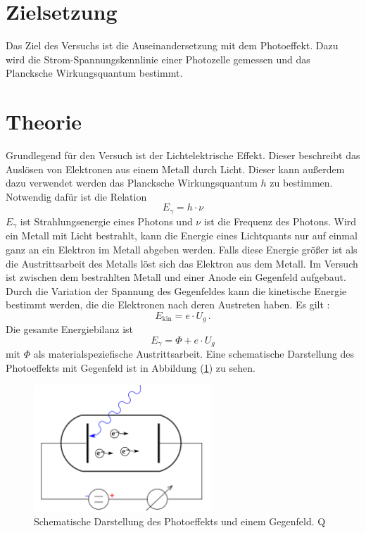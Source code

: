 \section{Zielsetzung}
\label{sec:Zielsetzung}
Das Ziel des Versuchs ist die Auseinandersetzung mit dem Photoeffekt. 
Dazu wird die Strom-Spannungskennlinie einer Photozelle gemessen und 
das Plancksche Wirkungsquantum bestimmt. 
\section{Theorie}
\label{sec:Theorie}
Grundlegend für den Versuch ist der Lichtelektrische Effekt. Dieser 
beschreibt das Auslösen von Elektronen aus einem Metall durch Licht. 
Dieser kann außerdem dazu verwendet werden das Plancksche Wirkungsquantum $h$
zu bestimmen. Notwendig dafür ist die Relation 
\begin{equation}
    E_\gamma = h \cdot \nu
    \label{eqn:E_gamma}
\end{equation}
$E_\gamma$ ist Strahlungsenergie eines Photons und $\nu$ ist die Frequenz 
des Photons. Wird ein Metall mit Licht bestrahlt, kann die Energie 
eines Lichtquants nur auf einmal ganz an ein Elektron im Metall 
abgeben werden. Falls diese Energie größer ist als die Austrittsarbeit 
des Metalls löst sich das Elektron aus dem Metall. Im Versuch ist 
zwischen dem bestrahlten Metall und einer Anode ein Gegenfeld aufgebaut. 
Durch die Variation der Spannung des Gegenfeldes kann die kinetische Energie 
bestimmt werden, die die Elektronen nach deren Austreten haben. 
Es gilt : 
\begin{equation}
    E_{\text{kin}} = e \cdot U_g \,.
\end{equation}
Die gesamte Energiebilanz ist 
\begin{equation}
    E_{\gamma} = \Phi + e \cdot U_g 
    \label{eqn:E_gamma2}
\end{equation}
mit $\Phi$ als materialspeziefische Austrittsarbeit. 
Eine schematische Darstellung des Photoeffekts mit Gegenfeld ist in 
Abbildung (\ref{fig:Schematische_Idee}) zu sehen. 
\begin{figure}[H]
  \centering
  \includegraphics[width=0.6\textwidth]{content/Bilder/Schematischer_Aufbau.png}
  \caption{Schematische Darstellung des Photoeffekts und einem Gegenfeld. Q\cite{anleitungV500}}
  \label{fig:Schematische_Idee}
\end{figure}
